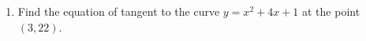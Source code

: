 \begin{enumerate}
\item Find the equation of tangent to the curve $y = x^2 + 4x + 1$ at the point $(3,22)$.
\end{enumerate}		
